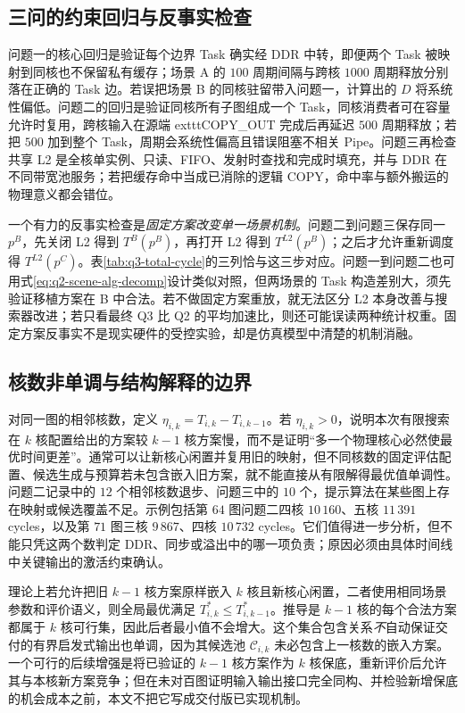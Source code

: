 \subsection{三问的约束回归与反事实检查}
问题一的核心回归是验证每个边界 Task 确实经 DDR 中转，即便两个 Task 被映射到同核也不保留私有缓存；场景 A 的 $100$ 周期间隔与跨核 $1000$ 周期释放分别落在正确的 Task 边。若误把场景 B 的同核驻留带入问题一，计算出的 $D$ 将系统性偏低。问题二的回归是验证同核所有子图组成一个 Task，同核消费者可在容量允许时复用，跨核输入在源端 	exttt{COPY\_OUT} 完成后再延迟 $500$ 周期释放；若把 $500$ 加到整个 Task，周期会系统性偏高且错误阻塞不相关 Pipe。问题三再检查共享 L2 是全核单实例、只读、FIFO、发射时查找和完成时填充，并与 DDR 在不同带宽池服务；若把缓存命中当成已消除的逻辑 COPY，命中率与额外搬运的物理意义都会错位。

一个有力的反事实检查是\emph{固定方案改变单一场景机制}。问题二到问题三保存同一 $p^B$，先关闭 L2 得到 $T^B(p^B)$，再打开 L2 得到 $T^{L2}(p^B)$；之后才允许重新调度得 $T^{L2}(p^C)$。表\ref{tab:q3-total-cycle}的三列恰与这三步对应。问题一到问题二也可用式\eqref{eq:q2-scene-alg-decomp}设计类似对照，但两场景的 Task 构造差别大，须先验证移植方案在 B 中合法。若不做固定方案重放，就无法区分 L2 本身改善与搜索器改进；若只看最终 Q3 比 Q2 的平均加速比，则还可能误读两种统计权重。固定方案反事实不是现实硬件的受控实验，却是仿真模型中清楚的机制消融。

\subsection{核数非单调与结构解释的边界}
对同一图的相邻核数，定义 $\eta_{i,k}=T_{i,k}-T_{i,k-1}$。若 $\eta_{i,k}>0$，说明本次有限搜索在 $k$ 核配置给出的方案较 $k-1$ 核方案慢，而不是证明“多一个物理核心必然使最优时间更差”。通常可以让新核心闲置并复用旧的映射，但不同核数的固定评估配置、候选生成与预算若未包含嵌入旧方案，就不能直接从有限解得最优值单调性。问题二记录中的 $12$ 个相邻核数退步、问题三中的 $10$ 个，提示算法在某些图上存在映射或候选覆盖不足。示例包括第 $64$ 图问题二四核 $10\,160$、五核 $11\,391$ cycles，以及第 $71$ 图三核 $9\,867$、四核 $10\,732$ cycles。它们值得进一步分析，但不能只凭这两个数判定 DDR、同步或溢出中的哪一项负责；原因必须由具体时间线中关键输出的激活约束确认。

理论上若允许把旧 $k-1$ 核方案原样嵌入 $k$ 核且新核心闲置，二者使用相同场景参数和评价语义，则全局最优满足 $T^*_{i,k}\le T^*_{i,k-1}$。推导是 $k-1$ 核的每个合法方案都属于 $k$ 核可行集，因此后者最小值不会增大。这个集合包含关系\emph{不}自动保证交付的有界启发式输出也单调，因为其候选池 $\mathcal C_{i,k}$ 未必包含上一核数的嵌入方案。一个可行的后续增强是将已验证的 $k-1$ 核方案作为 $k$ 核保底，重新评价后允许其与本核新方案竞争；但在未对百图证明输入输出接口完全同构、并检验新增保底的机会成本之前，本文不把它写成交付版已实现机制。

